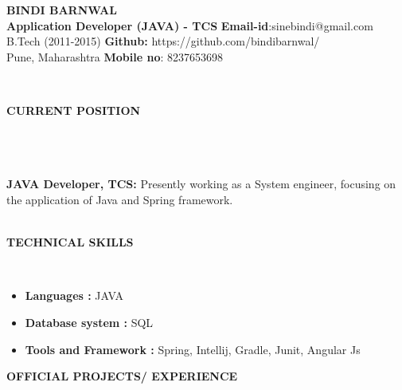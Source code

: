 \documentclass[a4paper,10pt]{article}
\newcommand{\lsep}{-0.5cm}
\newcommand{\resheading}[1]{{\small \colorbox{mygrey}{\begin{minipage}{0.975\textwidth}{\textbf{#1 \vphantom{p\^{E}}}}\end{minipage}}}}
\begin{document}
\begin{center}
\textbf{\Huge BINDI BARNWAL \\ }  
\indent \hfill \break
\indent \textbf{Application Developer (JAVA) - TCS} \hfill \textbf{Email-id}:{sinebindi@gmail.com} \\
\indent B.Tech (2011-2015)  \hfill \textbf{Github:} {https://github.com/bindibarnwal/} \\
\indent Pune, Maharashtra \hfill \textbf{Mobile no}: {8237653698} \\
\end{center}

\hspace{0.3cm}\\[-0.1cm]
\resheading{\textbf{CURRENT POSITION} }\\[\lsep] \\ \\
\textbf{JAVA Developer, TCS: } Presently working as a System engineer, focusing on the application of Java and Spring framework. \\
\hspace{0.5cm}\\[-0.2cm]
\resheading{\textbf{TECHNICAL SKILLS} }\\[\lsep]
\begin{itemize}
\item \textbf{Languages :} JAVA  
\item \textbf{Database system :} SQL 
\item \textbf{Tools and Framework :} Spring, Intellij, Gradle, Junit, Angular Js 
\end{itemize}
\resheading{\textbf{OFFICIAL PROJECTS/ EXPERIENCE} }\\[\lsep]
\end{document}

